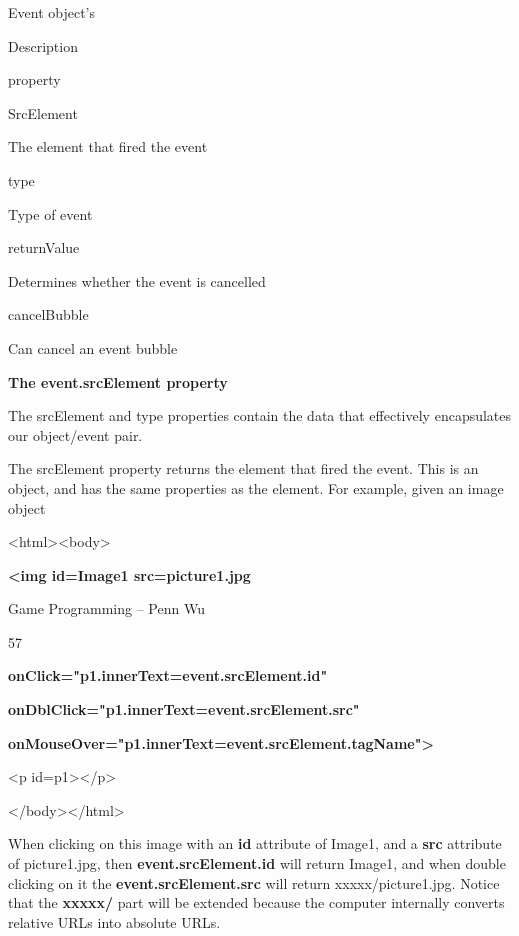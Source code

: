 \documentclass[
]{article}
\begin{document}
Event object's

Description

property

SrcElement

The element that fired the event

type

Type of event

returnValue

Determines whether the event is cancelled

cancelBubble

Can cancel an event bubble

\textbf{}

\textbf{The event.srcElement property}

The srcElement and type properties contain the data that effectively
encapsulates our object/event pair.

The srcElement property returns the element that fired the event. This
is an object, and has the same properties as the element. For example,
given an image object

\textless html\textgreater\textless body\textgreater{}

\textbf{\textless img id=\textquotesingle Image1\textquotesingle{}
src=\textquotesingle picture1.jpg\textquotesingle{}}

Game Programming -- Penn Wu

57

\protect\hypertarget{index_split_005.htmlux5cux23p58}{}{}
\textbf{onClick="p1.innerText=event.srcElement.id"}

\textbf{onDblClick="p1.innerText=event.srcElement.src"}

\textbf{onMouseOver="p1.innerText=event.srcElement.tagName"\textgreater{}}

\textless p id=p1\textgreater\textless/p\textgreater{}

\textless/body\textgreater\textless/html\textgreater{}

When clicking on this image with an \textbf{id} attribute of
\textquotesingle Image1\textquotesingle, and a \textbf{src} attribute of
\textquotesingle picture1.jpg\textquotesingle, then
\textbf{event.srcElement.id} will return
\textquotesingle Image1\textquotesingle, and when double clicking on it
the \textbf{event.srcElement.src} will return
\textquotesingle xxxxx/picture1.jpg\textquotesingle. Notice that the
\textbf{xxxxx/} part will be extended because the computer internally
converts relative URLs into absolute URLs.
\end{document}
